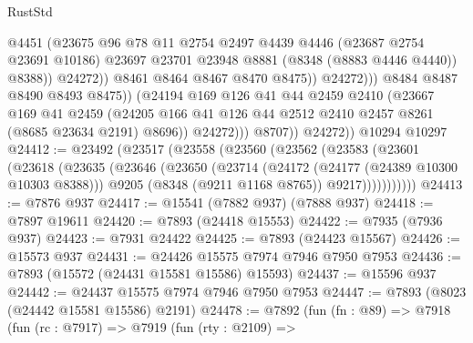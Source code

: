 \begin{lexlean}{RustStd}
\begin{coremodule}
                                    @4451
                                    (@23675
                                      @96
                                      @78
                                      @11
                                      @2754
                                      @2497
                                      @4439
                                      @4446
                                      (@23687 @2754 @23691 @10186)
                                      @23697
                                      @23701
                                      @23948
                                      @8881
                                      (@8348 (@8883 @4446 @4440))
                                      @8388))
                                  @24272))
                              @8461
                              @8464
                              @8467
                              @8470
                              @8475))
                          @24272)))
                    @8484
                    @8487
                    @8490
                    @8493
                    @8475))
                (@24194
                  @169
                  @126
                  @41
                  @44
                  @2459
                  @2410
                  (@23667
                    @169
                    @41
                    @2459
                    (@24205 @166 @41 @126 @44 @2512 @2410 @2457 @8261 (@8685 @23634 @2191) @8696))
                  @24272)))
            @8707))
        @24272))
    @10294
    @10297
@24412 := @23492
    (@23517
      (@23558
        (@23560
          (@23562
            (@23583
              (@23601
                (@23618
                  (@23635
                    (@23646
                      (@23650
                        (@23714
                          (@24172 (@24177 (@24389 @10300 @10303 @8388)))
                          @9205
                          (@8348 (@9211 @1168 @8765))
                          @9217)))))))))))
@24413 := @7876 @937
@24417 := @15541 (@7882 @937) (@7888 @937)
@24418 := @7897 @19611
@24420 := @7893 (@24418 @15553)
@24422 := @7935 (@7936 @937)
@24423 := @7931 @24422
@24425 := @7893 (@24423 @15567)
@24426 := @15573 @937
@24431 := @24426 @15575 @7974 @7946 @7950 @7953
@24436 := @7893 (@15572 (@24431 @15581 @15586) @15593)
@24437 := @15596 @937
@24442 := @24437 @15575 @7974 @7946 @7950 @7953
@24447 := @7893 (@8023 (@24442 @15581 @15586) @2191)
@24478 := @7892
    (fun (fn : @89) =>
    @7918
      (fun (rc : @7917) =>
      @7919
        (fun (rty : @2109) =>

\end{coremodule}
\end{lexlean}
